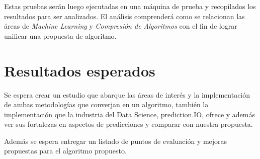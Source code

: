 \documentclass{udparticle}
\begin{document}
Estas pruebas serán luego ejecutadas en una máquina de prueba y recopilados los resultados para ser analizados.
El análisis comprenderá como se relacionan las áreas de \emph{Machine Learning} y \emph{Compresión de Algoritmos} con el fin de lograr unificar una propuesta de algoritmo. 

\section{Resultados esperados}

Se espera crear un estudio que abarque las áreas de interés y la implementación de ambas metodologías que converjan en un algoritmo, 
también la implementación que la industria del Data Science, prediction.IO, ofrece y además ver sus fortalezas en aspectos de predicciones y comparar con nuestra propuesta.

Además se espera entregar un listado de puntos de evaluación y mejoras propuestas para el algoritmo propuesto.


\end{document}
